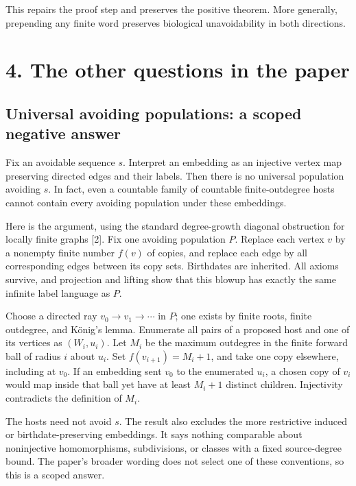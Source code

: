 \documentclass[
  11pt,
]{article}
\begin{document}
This repairs the proof step and preserves the positive theorem. More
generally, prepending any finite word preserves biological
unavoidability in both directions.

\section{4. The other questions in the
paper}\label{the-other-questions-in-the-paper}

\subsection{Universal avoiding populations: a scoped negative
answer}\label{universal-avoiding-populations-a-scoped-negative-answer}

Fix an avoidable sequence \(s\). Interpret an embedding as an injective
vertex map preserving directed edges and their labels. Then there is no
universal population avoiding \(s\). In fact, even a countable family of
countable finite-outdegree hosts cannot contain every avoiding
population under these embeddings.

Here is the argument, using the standard degree-growth diagonal
obstruction for locally finite graphs {[}2{]}. Fix one avoiding
population \(P\). Replace each vertex \(v\) by a nonempty finite number
\(f(v)\) of copies, and replace each edge by all corresponding edges
between its copy sets. Birthdates are inherited. All axioms survive, and
projection and lifting show that this blowup has exactly the same
infinite label language as \(P\).

Choose a directed ray \(v_0\to v_1\to\cdots\) in \(P\); one exists by
finite roots, finite outdegree, and König's lemma. Enumerate all pairs
of a proposed host and one of its vertices as \((W_i,u_i)\). Let \(M_i\)
be the maximum outdegree in the finite forward ball of radius \(i\)
about \(u_i\). Set \(f(v_{i+1})=M_i+1\), and take one copy elsewhere,
including at \(v_0\). If an embedding sent \(v_0\) to the enumerated
\(u_i\), a chosen copy of \(v_i\) would map inside that ball yet have at
least \(M_i+1\) distinct children. Injectivity contradicts the
definition of \(M_i\).

The hosts need not avoid \(s\). The result also excludes the more
restrictive induced or birthdate-preserving embeddings. It says nothing
comparable about noninjective homomorphisms, subdivisions, or classes
with a fixed source-degree bound. The paper's broader wording does not
select one of these conventions, so this is a scoped answer.
\end{document}
